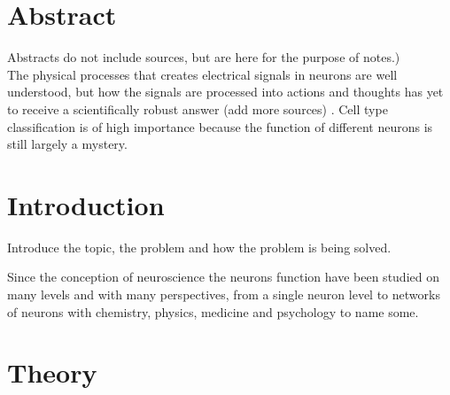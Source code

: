 \documentclass[altfont, fleqn]{uiophd}
\begin{document}
\chapter*{Abstract}
Abstracts do not include sources, but are here for the purpose of notes.) \\

\noindent
The physical processes that creates electrical signals in neurons are well understood, 
but how the signals are processed into actions and thoughts has yet to 
receive a scientifically robust answer
(add more sources) 
\cite{sterratt_principles_2011}. 
Cell type classification is of high importance because the function of different 
neurons is still largely a mystery. 
\setcounter{tocdepth}{1}
\startcontents
\tableofcontents
\chapter{Introduction}
Introduce the topic, the problem and how the problem is being solved. 

Since 
the conception of neuroscience the neurons function have been studied on many levels
and with many perspectives, 
from a single neuron level to networks of neurons with chemistry, physics, medicine
and psychology to name some. 


\chapter{Theory}

\vspace{1em} 
\startcontents
{}
  
\end{document}
